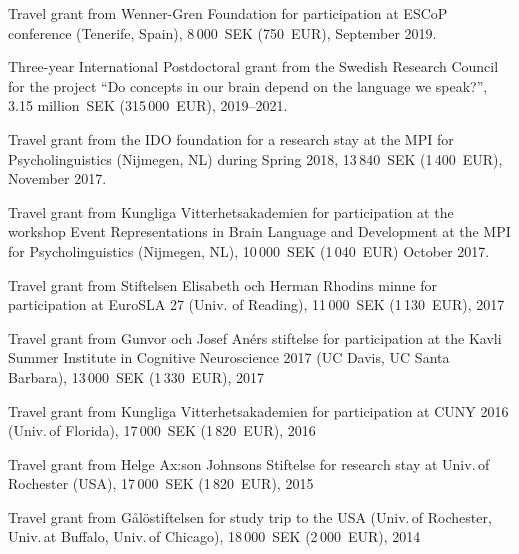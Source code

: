 \documentclass[margin, 11pt]{res} %
\begin{document}
\begin{resume}

Travel grant from Wenner-Gren Foundation for participation at ESCoP conference (Tenerife, Spain), 8\,000~SEK (750~EUR), September 2019.

Three-year International Postdoctoral grant from the Swedish Research Council for the project ``Do concepts in our brain depend on the language we speak?'', 3.15 million~SEK (315\,000~EUR), 2019--2021.

Travel grant from the IDO foundation for a research stay at the MPI for Psycholinguistics (Nijmegen, NL) during Spring 2018, 13\,840~SEK (1\,400~EUR), November 2017.

Travel grant from Kungliga Vitterhetsakademien for participation at the workshop Event Representations in Brain Language and Development at the MPI for Psycholinguistics (Nijmegen, NL), 10\,000~SEK (1\,040~EUR) October 2017.

Travel grant from Stiftelsen Elisabeth och Herman Rhodins minne for participation at EuroSLA 27 (Univ. of Reading), 11\,000~SEK (1\,130~EUR), 2017

Travel grant from Gunvor och Josef An\'{e}rs stiftelse for participation at the Kavli Summer Institute in Cognitive Neuroscience 2017 (UC Davis, UC Santa Barbara), 13\,000~SEK (1\,330~EUR), 2017

Travel grant from Kungliga Vitterhetsakademien for participation at CUNY 2016 (Univ.\,of Florida), 17\,000~SEK (1\,820~EUR), 2016

Travel grant from Helge Ax:son Johnsons Stiftelse for research stay at Univ.\,of Rochester (USA), 17\,000~SEK (1\,820~EUR), 2015

Travel grant from G\aa l\"{o}stiftelsen for study trip to the USA (Univ.\,of Rochester, Univ.\,at Buffalo, Univ.\,of Chicago), 18\,000~SEK (2\,000~EUR), 2014
 










\end{resume}
\end{document}
